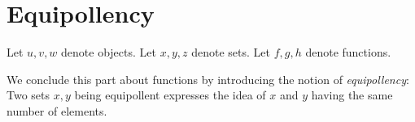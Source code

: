 \documentclass[../../set-theory.tex]{subfiles}
\begin{document}
  \section{Equipollency}

  \begin{forthel}
  \end{forthel}

  \begin{forthel}
    Let $u,v,w$ denote objects.
    Let $x,y,z$ denote sets.
    Let $f,g,h$ denote functions.
  \end{forthel}

  \noindent We conclude this part about functions by introducing the notion of
  \textit{equipollency}:
  Two sets $x,y$ being equipollent expresses the idea of $x$ and $y$ having the
  same number of elements.
\end{document}

